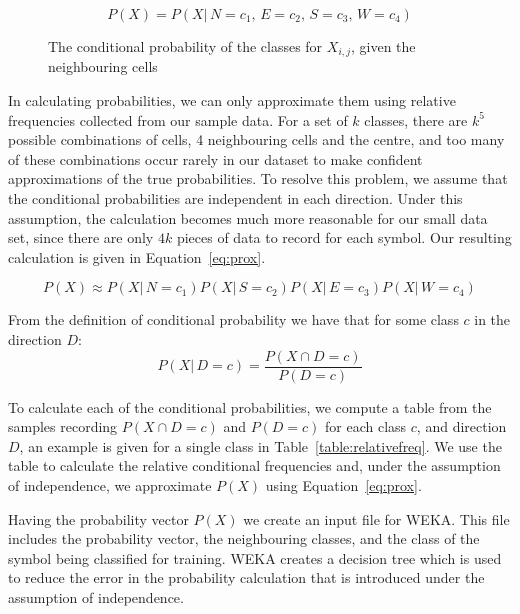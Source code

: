 \[
P(X) = P(X|\,N\!=\!c_1,\,E\!=\!c_2,\,S\!=\!c_3,\,W\!=\!c_4)
\]

\begin{figure}[h]
\begin{center}
\end{center}
\caption{The conditional probability of the classes for $X_{i,j}$, given the neighbouring cells}
\label{fig:conditionalprob}
\end{figure}


In calculating probabilities, we can only approximate them using relative
frequencies collected from our sample data. For a set of $k$ classes, there are
$k^5$ possible combinations of cells, 4 neighbouring cells and the centre, and
too many of these combinations occur rarely in our dataset to make confident
approximations of the true probabilities. To resolve this problem, we assume
that the conditional probabilities are independent in each direction. Under
this assumption, the calculation becomes much more reasonable for our small
data set, since there are only $4k$ pieces of data to record for each symbol.
Our resulting calculation is given in Equation~\ref{eq:prox}.

\begin{equation}
\label{eq:prox}
P(X) \approx P(X|\,N\!=\!c_1)P(X|\,S\!=\!c_2)P(X|\,E\!=\!c_3)P(X|\,W\!=\!c_4)
\end{equation}

From the definition of conditional probability we have that for some class $c$ in
the direction $D$:
\[
P(X|\,D\!=\!c) = \frac{P(X \cap D\!=\!c)}{P(D=c)}
\]

To calculate each of the conditional probabilities, we compute a table from the
samples recording $P(X\cap D\!=\!c)$ and $P(D\!=\!c)$ for each class  $c$, and
direction $D$, an example is given for a single class in
Table~\ref{table:relativefreq}.  We use the table to calculate the relative
conditional frequencies and, under the assumption of independence, we
approximate $P(X)$ using Equation~\ref{eq:prox}.

Having the probability vector $P(X)$ we create an input file for WEKA.  This
file includes the probability vector, the neighbouring classes, and the class
of the symbol being classified for training. WEKA creates a decision tree which
is used to reduce the error in the probability calculation that is introduced
under the assumption of independence.

